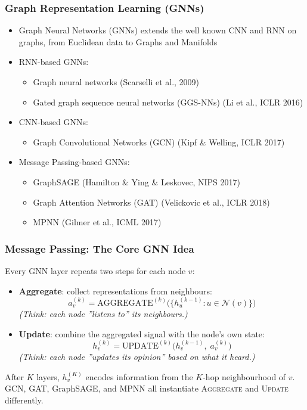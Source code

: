 \begin{frame}[fragile]\frametitle{Graph Representation Learning (GNNs)}

\begin{itemize}
		\item Graph Neural Networks (GNNs) extends the well known CNN and RNN on graphs, from Euclidean data to Graphs and Manifolds
		\item RNN-based GNNs: 
		\begin{itemize}
		\item Graph neural networks (Scarselli et al., 2009)
		\item Gated graph sequence neural networks (GGS-NNs) (Li et al., ICLR 2016)
		\end{itemize}

		\item CNN-based GNNs: 
		\begin{itemize}
 		\item Graph Convolutional Networks (GCN) (Kipf \& Welling, ICLR 2017)
		\end{itemize}

		\item Message Passing-based GNNs:
		\begin{itemize}
 		\item GraphSAGE (Hamilton \& Ying \& Leskovec, NIPS 2017)
 		\item Graph Attention Networks (GAT) (Velickovic et al., ICLR 2018) 
 		\item MPNN (Gilmer et al., ICML 2017)
		\end{itemize}

\end{itemize}

\end{frame}

\begin{frame}[fragile]\frametitle{Message Passing: The Core GNN Idea}

Every GNN layer repeats two steps for each node $v$:

\begin{itemize}
\item \textbf{Aggregate}: collect representations from neighbours:
	$$a_v^{(k)} = \mathrm{AGGREGATE}^{(k)}\!\bigl(\{h_u^{(k-1)} : u \in \mathcal{N}(v)\}\bigr)$$
	\emph{(Think: each node ''listens to'' its neighbours.)}

\item \textbf{Update}: combine the aggregated signal with the node's own state:
	$$h_v^{(k)} = \mathrm{UPDATE}^{(k)}\!\bigl(h_v^{(k-1)},\; a_v^{(k)}\bigr)$$
	\emph{(Think: each node ''updates its opinion'' based on what it heard.)}
\end{itemize}

After $K$ layers, $h_v^{(K)}$ encodes information from the $K$-hop neighbourhood of $v$. GCN, GAT, GraphSAGE, and MPNN all instantiate \textsc{Aggregate} and \textsc{Update} differently.

\end{frame}

